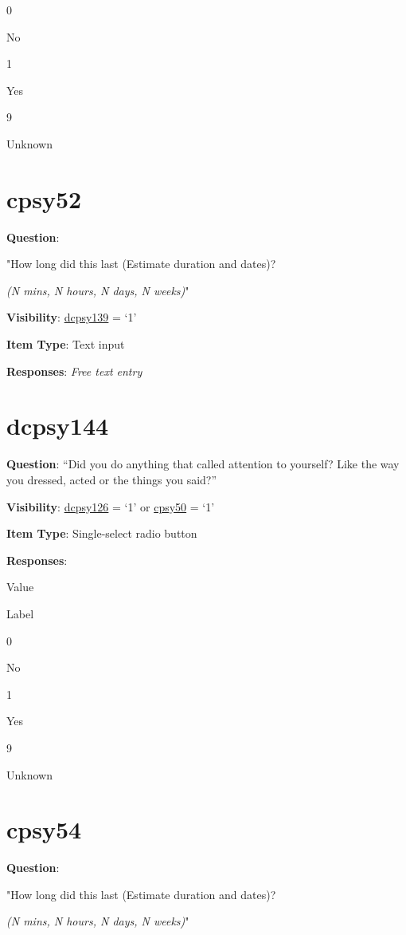 \documentclass[]{book}
\begin{document}
0

No

1

Yes

9

Unknown

\hypertarget{cpsy52}{%
\section{cpsy52}\label{cpsy52}}

\textbf{Question}:

"How long did this last (Estimate duration and dates)?

\emph{(N mins, N hours, N days, N weeks)}"

\textbf{Visibility}: \protect\hyperlink{dcpsy139}{dcpsy139} = `1'

\textbf{Item Type}: Text input

\textbf{Responses}: \emph{Free text entry}

\hypertarget{dcpsy144}{%
\section{dcpsy144}\label{dcpsy144}}

\textbf{Question}: ``Did you do anything that called attention to yourself? Like the way you dressed, acted or the things you said?''

\textbf{Visibility}: \protect\hyperlink{dcpsy126}{dcpsy126} = `1' or \protect\hyperlink{cpsy50}{cpsy50} = `1'

\textbf{Item Type}: Single-select radio button

\textbf{Responses}:

Value

Label

0

No

1

Yes

9

Unknown

\hypertarget{cpsy54}{%
\section{cpsy54}\label{cpsy54}}

\textbf{Question}:

"How long did this last (Estimate duration and dates)?

\emph{(N mins, N hours, N days, N weeks)}"
\end{document}
